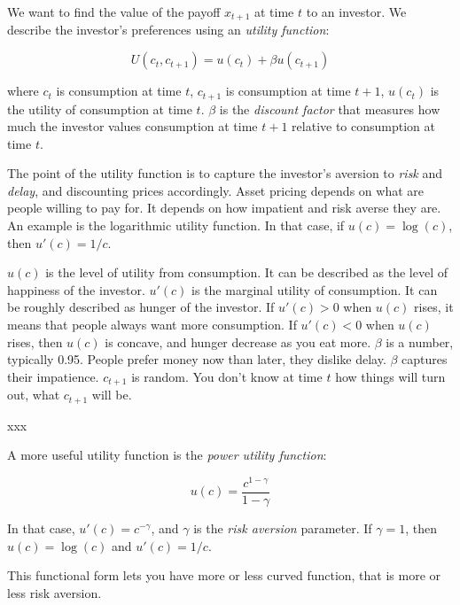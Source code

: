 We want to find the value of the payoff $x_{t+1}$ at time $t$ to an 
investor. We describe the investor's preferences using an 
\textit{utility function}:

\begin{equation}
    U(c_t, c_{t+1}) = u(c_t) + \beta u(c_{t+1})
\end{equation}

where $c_t$ is consumption at time $t$, $c_{t+1}$ is consumption at
time $t+1$, $u(c_t)$ is the utility of consumption at time $t$.
$\beta$ is the \textit{discount factor} that measures how much the
investor values consumption at time $t+1$ relative to consumption at
time $t$. 

The point of the utility function is to capture the investor's
aversion to \textit{risk} and \textit{delay}, and 
discounting prices accordingly. 
Asset pricing depends on what are people willing to pay for.
It depends on how impatient and risk averse they are.
An example is the logarithmic utility function. In that case,
if $u(c) = \log(c)$, then $u'(c) = 1/c$. 

$u(c)$ is the level of utility from consumption. It can be described 
as the level of happiness of the investor. $u'(c)$ is the 
marginal utility of consumption. It can be roughly described as 
hunger of the investor.
If $u'(c) > 0$ when $u(c)$ rises, it means that people 
always want more consumption. If $u'(c) < 0$ when $u(c)$ rises,
then $u(c)$ is concave, and hunger decrease as you eat more.
$\beta$ is a number, typically 0.95. People prefer money now 
than later, they dislike delay. $\beta$ captures their impatience.
$c_{t+1}$ is random. You don't know at time $t$ how things will 
turn out, what $c_{t+1}$ will be.

\begin{tcolorbox}[colback=white, colframe=black, title=Example X]
    xxx
\end{tcolorbox}

A more useful utility function is the \textit{power utility function}:

\begin{equation}
    u(c) = \frac{c^{1-\gamma}}{1-\gamma}
\end{equation}

In that case, $u'(c) = c^{-\gamma}$, and $\gamma$ is the \textit{risk aversion} parameter.
If $\gamma = 1$, then $u(c) = \log(c)$ and 
$u'(c) = 1/c$. 

This functional form lets you have more or less curved function,
that is more or less risk aversion.

